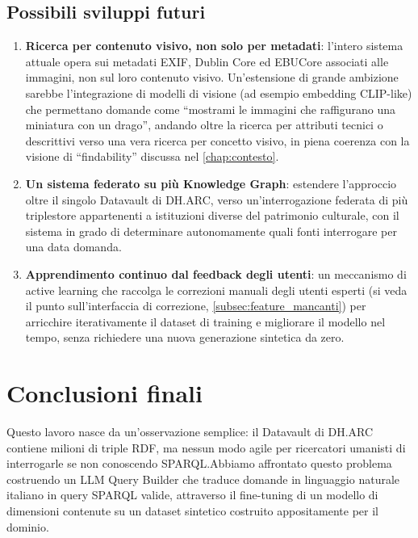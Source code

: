 \documentclass[12pt,a4paper,oneside]{book}
\begin{document}
\subsection{Possibili sviluppi futuri}\label{subsec:sviluppi_futuri}

\begin{enumerate}
    \item \textbf{Ricerca per contenuto visivo, non solo per metadati}: l'intero sistema attuale opera sui metadati EXIF, Dublin Core ed EBUCore associati alle immagini, non sul loro contenuto visivo. Un'estensione di grande ambizione sarebbe l'integrazione di modelli di visione (ad esempio embedding CLIP-like) che permettano domande come ``mostrami le immagini che raffigurano una miniatura con un drago'', andando oltre la ricerca per attributi tecnici o descrittivi verso una vera ricerca per concetto visivo, in piena coerenza con la visione di ``findability'' discussa nel \cref{chap:contesto}.
    \item \textbf{Un sistema federato su più Knowledge Graph}: estendere l'approccio oltre il singolo Datavault di DH.ARC, verso un'interrogazione federata di più triplestore appartenenti a istituzioni diverse del patrimonio culturale, con il sistema in grado di determinare autonomamente quali fonti interrogare per una data domanda.
    \item \textbf{Apprendimento continuo dal feedback degli utenti}: un meccanismo di active learning che raccolga le correzioni manuali degli utenti esperti (si veda il punto sull'interfaccia di correzione, \cref{subsec:feature_mancanti}) per arricchire iterativamente il dataset di training e migliorare il modello nel tempo, senza richiedere una nuova generazione sintetica da zero.
\end{enumerate}

\section{Conclusioni finali}\label{sec:conclusioni_finali}


Questo lavoro nasce da un'osservazione semplice: il Datavault di DH.ARC contiene milioni di triple RDF, ma nessun modo agile per ricercatori umanisti di interrogarle se non conoscendo SPARQL.\@ Abbiamo affrontato questo problema costruendo un LLM Query Builder che traduce domande in linguaggio naturale italiano in query SPARQL valide, attraverso il fine-tuning di un modello di dimensioni contenute su un dataset sintetico costruito appositamente per il dominio.
\end{document}
